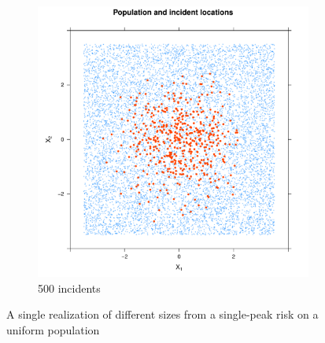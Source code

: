 \begin{figure}[htbp]
\begin{subfigure}{0.45\textwidth}
    \includegraphics[width=\textwidth]{results/unif_500_1.0_1h/output/population_and_incidents_scatter}
    \caption{500 incidents}
    \end{subfigure}
    \caption{A single realization of different sizes from a single-peak risk on a uniform population}
    \label{fig:one_sample:unif_NCases_1h}
\end{figure}

